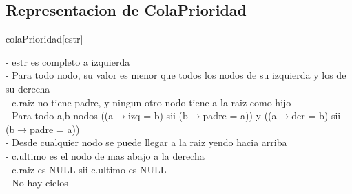 \begin{Representacion}
\subsection{Representacion de ColaPrioridad}
 
\begin{Estructura}{colaPrioridad}[estr]
    \begin{Tupla}[estr]%
  \end{Tupla}
\end{Estructura}

\begin{Tupla}[nodo]
\end{Tupla}


	
- estr es completo a izquierda \\
- Para todo nodo, su valor es menor que todos los nodos de su izquierda y los de su derecha \\
- c.raiz no tiene padre, y ningun otro nodo tiene a la raiz como hijo \\
- Para todo a,b nodos  ((a$\to$izq = b) sii (b$\to$padre = a)) y ((a$\to$der = b) sii (b$\to$padre = a)) \\
- Desde cualquier nodo se puede llegar a la raiz yendo hacia arriba \\
- c.ultimo es el nodo de mas abajo a la derecha \\
- c.raiz es NULL sii c.ultimo es NULL \\
- No hay ciclos \\

%
{

	
}%

\end{Representacion}
